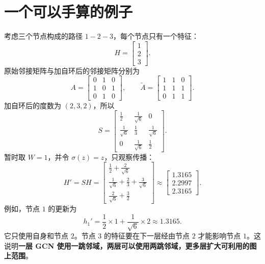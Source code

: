 \documentclass[UTF8,a4paper,11pt,fontset=fandol]{ctexart}
\begin{document}
\section{一个可以手算的例子}
考虑三个节点构成的路径 $1-2-3$，每个节点只有一个特征：
\begin{equation}
H=\begin{bmatrix}1\\2\\3\end{bmatrix}.
\end{equation}
原始邻接矩阵与加自环后的邻接矩阵分别为
\begin{equation}
A=\begin{bmatrix}0&1&0\\1&0&1\\0&1&0\end{bmatrix},
\qquad
\widetilde A=\begin{bmatrix}1&1&0\\1&1&1\\0&1&1\end{bmatrix}.
\end{equation}
加自环后的度数为 $(2,3,2)$，所以
\begin{equation}
S=\begin{bmatrix}
\frac12&\frac1{\sqrt6}&0\\[2pt]
\frac1{\sqrt6}&\frac13&\frac1{\sqrt6}\\[2pt]
0&\frac1{\sqrt6}&\frac12
\end{bmatrix}.
\end{equation}
暂时取 $W=1$，并令 $\sigma(z)=z$，只观察传播：
\begin{equation}
H'=SH=
\begin{bmatrix}
\frac12+\frac2{\sqrt6}\\[3pt]
\frac1{\sqrt6}+\frac23+\frac3{\sqrt6}\\[3pt]
\frac2{\sqrt6}+\frac32
\end{bmatrix}
\approx\begin{bmatrix}1.3165\\2.2997\\2.3165\end{bmatrix}.
\end{equation}
例如，节点 $1$ 的更新为
\begin{equation}
h_1'=\frac12\times1+\frac1{\sqrt6}\times2\approx1.3165.
\end{equation}
它只使用自身和节点 $2$。节点 $3$ 的特征要在下一层经由节点 $2$ 才能影响节点 $1$。这说明\textbf{一层 GCN 使用一跳邻域，两层可以使用两跳邻域，更多层扩大可利用的图上范围}。
\end{document}
